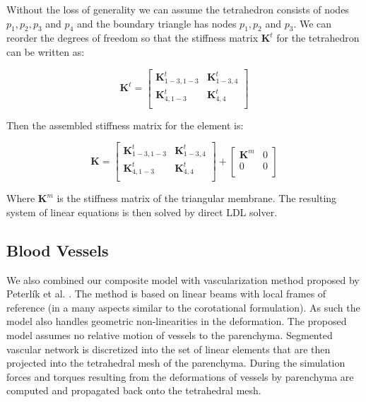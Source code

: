 \documentclass{llncs}
\newcommand{\Mat}[1]{\mathbf{#1}}
\begin{document}
Without the loss of generality we can assume the tetrahedron consists of
nodes $p_1, p_2, p_3$ and $p_4$ and the boundary triangle has nodes $p_1, p_2$
and $p_3$. We can reorder the degrees of freedom so that the stiffness
matrix $\Mat{K}^t$ for the tetrahedron can be written as:

\begin{equation}
  \Mat{K}^t = \left[\begin{array}{c|c}
      \Mat{K}^t_{1-3,1-3} & \Mat{K}^t_{1-3,4} \\
      \hline
      \Mat{K}^t_{4,1-3} & \Mat{K}^t_{4,4} \\
  \end{array}\right]
\end{equation}

Then the assembled stiffness matrix for the element is:

\begin{equation}
  \Mat{K} = \left[\begin{array}{c|c}
      \Mat{K}^t_{1-3,1-3} & \Mat{K}^t_{1-3,4} \\
      \hline
      \Mat{K}^t_{4,1-3} & \Mat{K}^t_{4,4} \\
  \end{array}\right]
  +
  \left[\begin{array}{c|c}
      \Mat{K}^m & 0 \\
      \hline
      0 & 0 \\
  \end{array}\right]
\end{equation}

Where $\Mat{K}^m$ is the stiffness matrix of the triangular membrane.
The resulting
system of linear equations is then solved by direct LDL solver.


\subsection{Blood Vessels} %

We also combined our composite model with vascularization method proposed
by Peterl\'{i}k et al. \cite{Peterlik2012}. The method is based on linear beams
with local frames of reference (in a many aspects similar to the
corotational formulation). As such the model also handles geometric
non-linearities in the deformation. The proposed model assumes no relative
motion of vessels to the parenchyma. Segmented vascular network is
discretized into the set of linear elements that are then projected into
the tetrahedral mesh of the parenchyma. During the simulation forces and
torques resulting from the deformations of vessels by parenchyma are
computed and propagated back onto the tetrahedral mesh.
\end{document}
